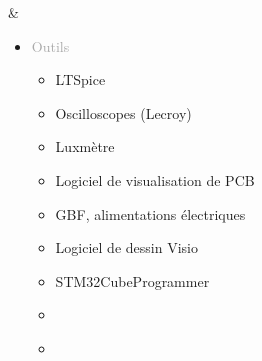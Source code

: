 \documentclass{article}
\begin{document}
\begin{tabular}
\begin{itemize}[label={}, topsep=8pt, partopsep=0pt, itemsep=0.5pt, parsep=2pt, after=\vspace*{-\baselineskip}]
\begin{itemize}[label={\textcolor{gray!80}{$\checkmark$}}, topsep=8pt, partopsep=0pt, itemsep=0.5pt, parsep=2pt]
        \end{itemize}
    \end{itemize}
    &
    \begin{itemize}[label={}, topsep=8pt, partopsep=0pt, itemsep=0.5pt, parsep=2pt, after=\vspace*{-\baselineskip}]
        \setlength{\itemsep}{10pt} 
        \item \textcolor{darkGray}{Outils}
        \begin{itemize}[label={\textcolor{gray!80}{\checkmark}}, topsep=8pt, partopsep=0pt, itemsep=0.5pt, parsep=2pt] 
            \item \textcolor{gray!80}{LTSpice}
            \item \textcolor{gray!80}{Oscilloscopes (Lecroy)}
            \item \textcolor{gray!80}{Luxmètre}
            \item \textcolor{gray!80}{Logiciel de visualisation de PCB}
            \item \textcolor{gray!80}{GBF, alimentations électriques}
            \item \textcolor{gray!80}{Logiciel de dessin Visio}
            \item \textcolor{gray!80}{STM32CubeProgrammer}
            \item[\textcolor{white}{\checkmark}] \textcolor{gray!80}{} %
            \item[\textcolor{white}{\checkmark}] \textcolor{gray!80}{} %
        \end{itemize}
    \end{itemize}
\end{tabular}

\begin{center}
\end{center}

\end{document}
